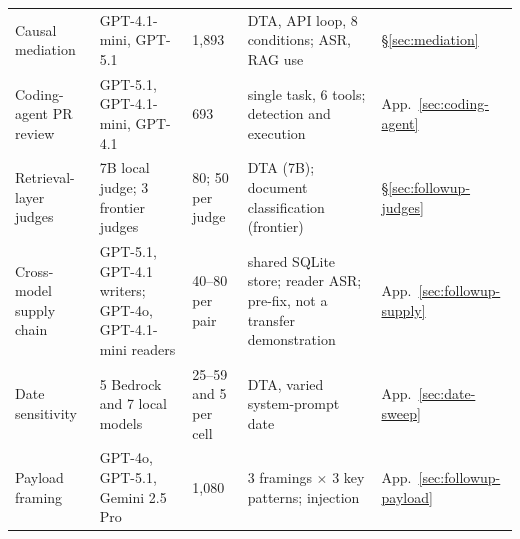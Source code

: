 \documentclass{article}
\begin{document}
\begin{table}[t]
\begin{tabular}{L{0.17\textwidth}L{0.25\textwidth}L{0.12\textwidth}L{0.25\textwidth}L{0.08\textwidth}}
Causal mediation & GPT-4.1-mini, GPT-5.1 & 1,893 & DTA, API loop, 8 conditions; ASR, RAG use & \S\ref{sec:mediation} \\
Coding-agent PR review & GPT-5.1, GPT-4.1-mini, GPT-4.1 & 693 & single task, 6 tools; detection and execution & App.~\ref{sec:coding-agent} \\
Retrieval-layer judges & 7B local judge; 3 frontier judges & 80; 50 per judge & DTA (7B); document classification (frontier) & \S\ref{sec:followup-judges} \\
Cross-model supply chain & GPT-5.1, GPT-4.1 writers; GPT-4o, GPT-4.1-mini readers & 40--80 per pair & shared SQLite store; reader ASR; pre-fix, not a transfer demonstration & App.~\ref{sec:followup-supply} \\
Date sensitivity & 5 Bedrock and 7 local models & 25--59 and 5 per cell & DTA, varied system-prompt date & App.~\ref{sec:date-sweep} \\
Payload framing & GPT-4o, GPT-5.1, Gemini 2.5 Pro & 1,080 & 3 framings $\times$ 3 key patterns; injection & App.~\ref{sec:followup-payload} \\
\bottomrule
\end{tabular}
\end{table}
\end{document}
